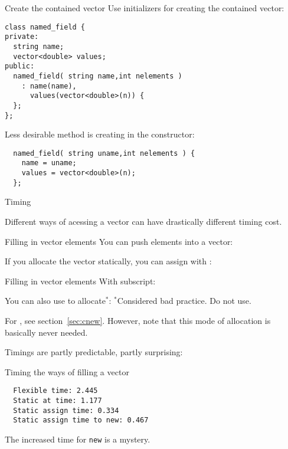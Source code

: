 \begin{block}{Create the contained vector}
  \label{sl:class-has-vector}
  Use initializers for creating the contained vector:
\begin{lstlisting}
class named_field {
private:
  string name;
  vector<double> values;
public:
  named_field( string name,int nelements )
    : name(name),
      values(vector<double>(n)) {
  };
};
\end{lstlisting}

Less desirable method is creating in the constructor:
\begin{lstlisting}
  named_field( string uname,int nelements ) {
    name = uname;
    values = vector<double>(n);
  };
\end{lstlisting}
\end{block}

 {Timing}

Different ways of acessing a vector can have drastically different
timing cost.

\begin{block}{Filling in vector elements}
  \label{sl:vect-extend-code}
  You can push elements into a vector:

  If you allocate the vector statically, you can assign with :
\end{block}

\begin{block}{Filling in vector elements}
  \label{sl:vect-extend-code2}
  With subscript:

  You can also use  to allocate$^*$:
  $^*$Considered bad practice. Do not use.
\end{block}

For , see section~\ref{sec:cnew}. However, note that
this mode of allocation is basically never needed.

Timings are partly predictable, partly surprising:
\begin{block}{Timing the ways of filling a vector}
  \label{sl:vector-extend-time}
\begin{lstlisting}
  Flexible time: 2.445
  Static at time: 1.177
  Static assign time: 0.334
  Static assign time to new: 0.467
\end{lstlisting}
\end{block}

The increased time for \lstinline{new} is a mystery.

